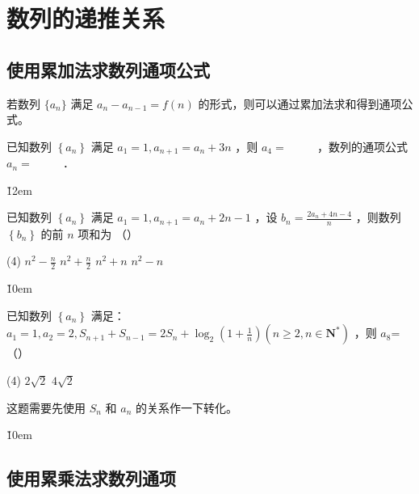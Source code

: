 \section{数列的递推关系}

\subsection{使用累加法求数列通项公式}

\begin{theorem}[$a_{n} - a_{n-1} = f(n)$ 形式]
    若数列 $\{a_n\}$ 满足 $a_{n} - a_{n-1} = f(n)$ 的形式，则可以通过累加法求和得到通项公式。
\end{theorem}

\begin{example}
    已知数列 $\left\{a_n\right\}$ 满足 $a_1=1, a_{n+1}=a_n+3 n$ ，则 $a_4=$ \underline{$\qquad$} ，数列的通项公式 $a_n=$ \underline{$\qquad$} ．
\end{example}

\v{12em}

\begin{example}
    已知数列 $\left\{a_n\right\}$ 满足 $a_1=1, a_{n+1}=a_n+2 n-1$ ，设 $b_n=\frac{2 a_n+4 n-4}{n}$ ，则数列 $\left\{b_n\right\}$ 的前 $n$ 项和为 （\qquad）
    \begin{tasks}(4)
        \task $n^2-\frac{n}{2}$
        \task $n^2+\frac{n}{2}$
        \task $n^2+n$
        \task $n^2-n$
    \end{tasks}
\end{example}

\v{10em}

\begin{example}
    已知数列 $\left\{a_n\right\}$ 满足：$a_1=1, a_2=2, S_{n+1}+S_{n-1}=2 S_n+\log _2\left(1+\frac{1}{n}\right)\left(n \geq 2, n \in \mathbf{N}^*\right)$ ，则 $a_8$= （\qquad）
    \begin{tasks}(4)
        \task $2 \sqrt{2}$
        \task $4 \sqrt{2}$
    \end{tasks}
\end{example}

\begin{tips}
    这题需要先使用 $S_n$ 和 $a_n$ 的关系作一下转化。
\end{tips}

\v{10em}

\subsection{使用累乘法求数列通项}

